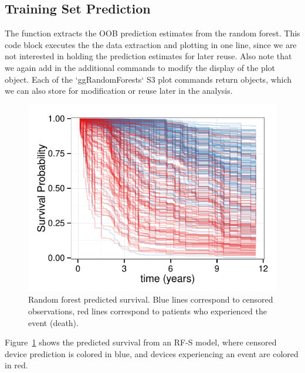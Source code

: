 \documentclass[nojss]{jss}\usepackage[]{graphicx}\usepackage[]{color}
\makeatletter
\def\maxwidth{ %
  \ifdim\Gin@nat@width>\linewidth
    \linewidth
  \else
    \Gin@nat@width
  \fi
}
\makeatother
\begin{document}
\subsection{Training Set Prediction}\label{S:prediction}

The  function extracts the OOB prediction estimates from the random forest. This code block executes the the data extraction and plotting in one line, since we are not interested in holding the prediction estimates for later reuse. Also note that we again add in the additional  commands to modify the display of the plot object. Each of the `ggRandomForests` S3 plot commands return  objects, which we can also store for modification or reuse later in the analysis. 

\begin{Schunk}
\begin{figure}[!htpb]

{\centering \includegraphics[width=\maxwidth]{figure/rfs-rfsrc-plot-1} 

}

\caption[Random forest predicted survival]{Random forest predicted survival. Blue lines correspond to censored observations, red lines correspond to patients who experienced the event (death).\label{fig:rfsrc-plot}}
\end{figure}
\end{Schunk}


Figure~\ref{fig:rfsrc-plot} shows the predicted survival from an RF-S model, where censored device prediction is colored in blue, and devices experiencing an event are colored in red. 
\end{document}
